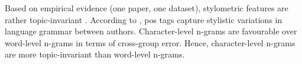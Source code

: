 Based on empirical evidence (one paper, one dataset), stylometric features are rather topic-invariant \citep{altakrori_topic_2021}.
According to \citet{altakrori_topic_2021}, \ac{pos} tags capture stylistic variations in language grammar between authors.
Character-level n-grams are favourable over word-level n-grams in terms of cross-group error.
Hence, character-level n-grams are more topic-invariant than word-level n-grams.
